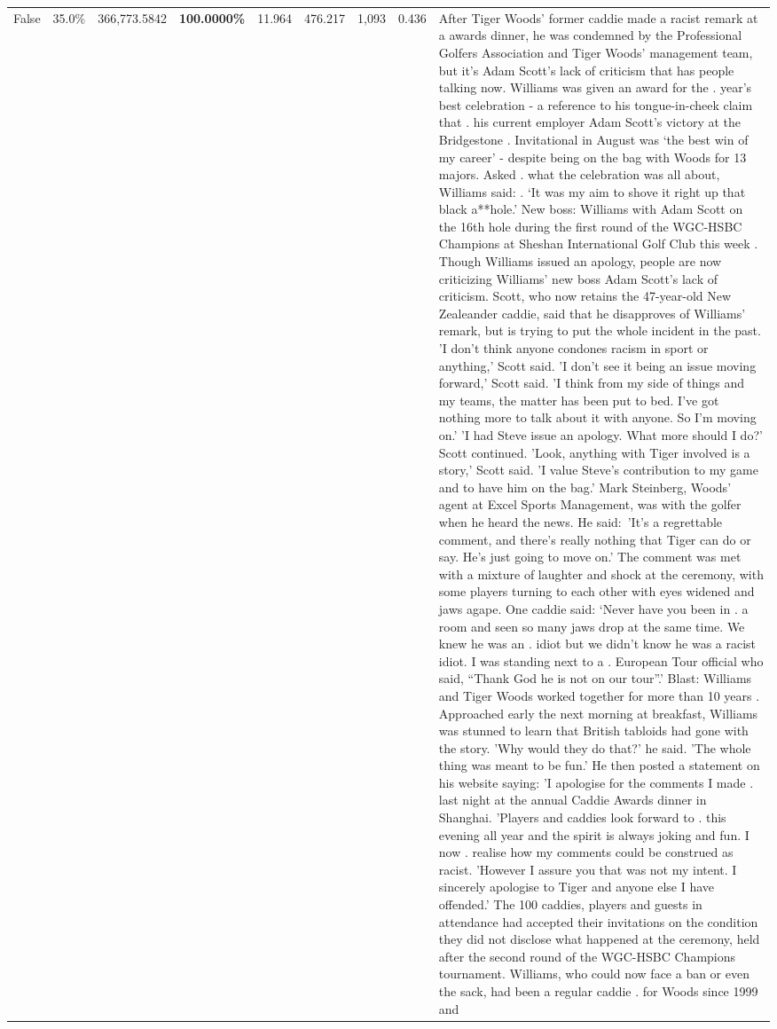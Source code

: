 \begin{table}[H]
\begin{tabular}{lllrlllll}
False & 35.0\% & 366,773.5842 & \bfseries \color{red} 100.0000\% & 11.964 & 476.217 & 1,093 & 0.436 & After Tiger Woods' former caddie made a racist remark at a awards dinner, he was condemned by the Professional Golfers Association and Tiger Woods' management team, but it's Adam Scott's lack of criticism that has people talking now. Williams was given an award for the . year’s best celebration - a reference to his tongue-in-cheek claim that . his current employer Adam Scott’s victory at the Bridgestone . Invitational in August was ‘the best win of my career’ - despite being on the bag with Woods for 13 majors. Asked . what the celebration was all about, Williams said: . ‘It was my aim to shove it right up that black a**hole.’ New boss: Williams with Adam Scott  on the 16th hole during the first round of the WGC-HSBC Champions at Sheshan International Golf Club this week . Though Williams issued an apology, people are now criticizing Williams' new boss Adam Scott's lack of criticism. Scott, who now retains the 47-year-old New Zealeander caddie, said that he disapproves of Williams' remark, but is trying to put the whole incident in the past. 'I don't think anyone condones racism in sport or anything,' Scott said. 'I don't see it being an issue moving forward,' Scott said. 'I think from my side of things and my teams, the matter has been put to bed. I've got nothing more to talk about it with anyone. So I'm moving on.' 'I had Steve issue an apology. What more should I do?' Scott continued. 'Look, anything with Tiger involved is a story,' Scott said. 'I value Steve's contribution to my game and to have him on the bag.' Mark Steinberg, Woods' agent at Excel Sports Management, was with the golfer when he heard the news. He said: 'It's a regrettable comment, and there's really nothing that Tiger can do or say. He's just going to move on.' The comment was met with a mixture of laughter and shock at the ceremony, with some players turning to each other with eyes widened and jaws agape. One caddie said: ‘Never have you been in . a room and seen so many jaws drop at the same time. We knew he was an . idiot but we didn’t know he was a racist idiot. I was standing next to a . European Tour official who said, “Thank God he is not on our tour”.’ Blast: Williams and Tiger Woods worked together for more than 10 years . Approached early the next morning at breakfast, Williams was stunned to learn that British tabloids had gone with the story. 'Why would they do that?' he said. 'The whole thing was meant to be fun.' He then posted a statement on his website saying: 'I apologise for the comments I made . last night at the annual Caddie Awards dinner in Shanghai. 'Players and caddies look forward to . this evening all year and the spirit is always joking and fun. I now . realise how my comments could be construed as racist. 'However I assure you that was not my intent. I sincerely apologise to Tiger and anyone else I have offended.' The 100 caddies, players and guests in attendance had accepted their invitations on the condition they did not disclose what happened at the ceremony, held after the second round of the WGC-HSBC Champions tournament. Williams, who could now face a ban or even the sack, had been a regular caddie . for Woods since 1999 and 
\end{tabular}
\end{table}
